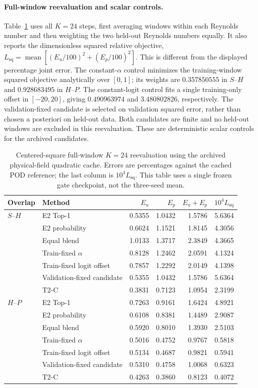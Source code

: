 \documentclass{article}
\begin{document}
\paragraph{Full-window reevaluation and scalar controls.}
Table~\ref{tab:t2c_full_window_controls} uses all $K=24$ steps, first
averaging windows within each Reynolds number and then weighting the
two held-out Reynolds numbers equally. It also reports the dimensionless
squared relative objective, $L_{\mathrm{sq}}=\operatorname{mean}
[(E_u/100)^2+(E_p/100)^2]$. This is different from the displayed
percentage joint error. The constant-$\alpha$ control minimizes the
training-window squared objective analytically over $[0,1]$; its weights
are $0.357850555$ in $S$--$H$ and $0.928683495$ in $H$--$P$.
The constant-logit control fits a single training-only offset in
$[-20,20]$, giving $0.490963974$ and $3.480802826$, respectively.
The validation-fixed candidate is selected on validation squared error,
rather than chosen a posteriori on held-out data. Both candidates are
finite and no held-out windows are excluded in this reevaluation.
These are deterministic scalar controls for the archived candidates.

\begin{table}[H]
\centering
\caption{Centered-square full-window $K=24$ reevaluation using the
archived physical-field quadratic cache. Errors are percentages against
the cached POD reference; the last column is $10^4 L_{\mathrm{sq}}$.
This table uses a single frozen gate checkpoint, not the three-seed mean.}
\label{tab:t2c_full_window_controls}
\small
\setlength{\tabcolsep}{3.5pt}
\begin{tabular}{@{}llrrrr@{}}
\toprule
Overlap & Method & $E_u$ & $E_p$ & $E_u+E_p$ & $10^4L_{\mathrm{sq}}$\\
\midrule
$S$--$H$ & E2 Top-1 & 0.5355 & 1.0432 & 1.5786 & 5.6364 \\
 & E2 probability & 0.6624 & 1.1521 & 1.8145 & 4.3056 \\
 & Equal blend & 1.0133 & 1.3717 & 2.3849 & 4.3665 \\
 & Train-fixed $\alpha$ & 0.8128 & 1.2462 & 2.0591 & 4.1324 \\
 & Train-fixed logit offset & 0.7857 & 1.2292 & 2.0149 & 4.1398 \\
 & Validation-fixed candidate & 0.5355 & 1.0432 & 1.5786 & 5.6364 \\
 & T2-C & 0.3831 & 0.7123 & 1.0954 & 2.3199 \\
\midrule
$H$--$P$ & E2 Top-1 & 0.7263 & 0.9161 & 1.6424 & 4.8921 \\
 & E2 probability & 0.6108 & 0.8381 & 1.4489 & 2.9087 \\
 & Equal blend & 0.5920 & 0.8010 & 1.3930 & 2.5103 \\
 & Train-fixed $\alpha$ & 0.5016 & 0.4752 & 0.9767 & 0.5818 \\
 & Train-fixed logit offset & 0.5134 & 0.4687 & 0.9821 & 0.5941 \\
 & Validation-fixed candidate & 0.5310 & 0.4758 & 1.0068 & 0.6323 \\
 & T2-C & 0.4263 & 0.3860 & 0.8123 & 0.4072 \\
\bottomrule
\end{tabular}
\end{table}
\end{document}
